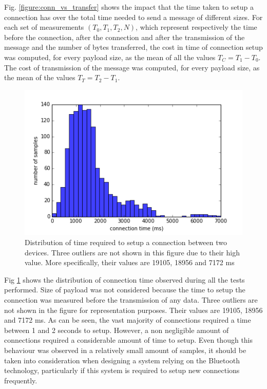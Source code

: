 Fig. \ref{figure:conn_vs_transfer} shows the impact that the time taken to setup a connection has over the total time needed to send a message of different sizes.
For each set of measurements $(T_0, T_1, T_2, N)$, which represent respectively the time before the connection, after the connection and after the transmission of the message and the number of bytes transferred, the cost in time of connection setup was computed, for every payload size, as the mean of all the values $T_C = T_1 - T_0$.
The cost of transmission of the message was computed, for every payload size, as the mean of the values $T_T = T_2 - T_1$.

\begin{figure}[ht!]
  \centering
  \includegraphics[width=1.0\textwidth]{application/img/setup_distribution.png}
  \caption{Distribution of time required to setup a connection between two devices. Three outliers are not shown in this figure due to their high value. More specifically, their values are 19105, 18956 and 7172 ms}
  \label{figure:conn_time_distribution}
\end{figure}

Fig \ref{figure:conn_time_distribution} shows the distribution of connection time observed during all the tests performed.
Size of payload was not considered because the time to setup the connection was measured before the transmission of any data. Three outliers are not shown in the figure for representation purposes. Their values are 19105, 18956 and 7172 ms.
As can be seen, the vast majority of connections required a time between 1 and 2 seconds to setup.
However, a non negligible amount of connections required a considerable amount of time to setup.
Even though this behaviour was observed in a relatively small amount of samples, it should be taken into consideration when designing a system relying on the Bluetooth technology, particularly if this system is required to setup new connections frequently.